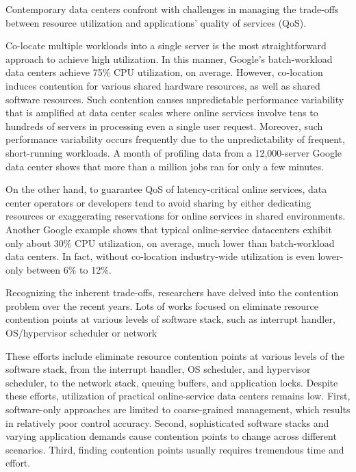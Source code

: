 
\begin{eabstract} 
  Contemporary data centers confront with challenges in managing the trade-offs
  between resource utilization and applications’ quality of services (QoS).

  Co-locate multiple workloads into a single server is the most straightforward
  approach to achieve high utilization. In this manner, Google’s batch-workload 
  data centers achieve 75\% CPU utilization, on average.  However, co-location
  induces contention for various shared hardware resources, as well as shared
  software resources. Such contention causes unpredictable performance variability
  that is amplified at data center scales where online services involve tens to
  hundreds of servers in processing even a single user request. Moreover, such
  performance variability occurs frequently due to the unpredictability of frequent,
  short-running workloads. A month of profiling data from a 12,000-server Google
  data center shows that more than a million jobs ran for only a few minutes.

  On the other hand, to guarantee QoS of latency-critical online services, data
  center operators or developers tend to avoid sharing by either dedicating
  resources or exaggerating reservations for online services in shared environments.
  Another Google example shows that typical online-service datacenters exhibit
  only about 30\% CPU utilization, on average, much lower than batch-workload
  data centers. In fact, without co-location industry-wide utilization is even
  lower-only between 6\% to 12\%.

  Recognizing the inherent trade-offs, researchers have delved into the contention problem over the recent years. Lots of works focused on eliminate resource contention points at various levels of software stack, such as interrupt handler, OS/hypervisor scheduler or network 

  These efforts include eliminate resource contention points at various levels of the software stack, from the interrupt handler, OS scheduler, and hypervisor scheduler, to the network stack, queuing buffers, and application locks. Despite these efforts, utilization of practical online-service data centers remains low. First, software-only approaches are limited to coarse-grained management, which results in relatively poor control accuracy. Second, sophisticated software stacks and varying application demands cause contention points to change across different scenarios. Third, finding contention points usually requires tremendous time and effort.

\end{eabstract}

